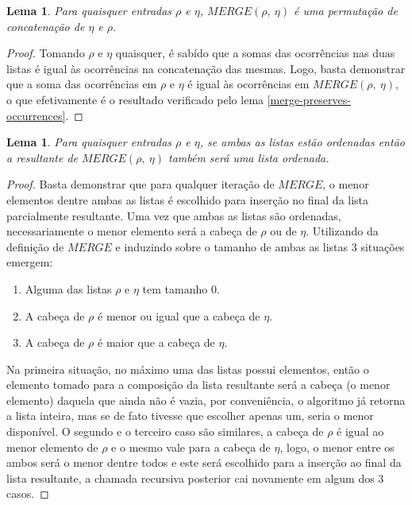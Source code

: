\documentclass[12pt]{article}
\newtheorem{lemma}[theorem]{Lema}
\theoremstyle{definition}
\begin{document}
\begin{lemma}
\label{merge-is-permutation}
        Para quaisquer entradas $\rho$ e $\eta$, $MERGE(\rho,\ \eta)$ é uma permutação de concatenação de $\eta$ e $\rho$.
\end{lemma}
\begin{proof}
        Tomando $\rho$ e $\eta$ quaisquer, é sabído que a somas das ocorrências nas duas listas é igual às ocorrências
        na concatenação das mesmas. Logo, basta demonstrar que a soma das ocorrências em $\rho$ e $\eta$ é igual às
        ocorrências em $MERGE(\rho,\ \eta)$, o que efetivamente é o resultado verificado pelo lema \ref{merge-preserves-occurrences}. 
\end{proof}

\begin{lemma}
\label{merge-of-sorted-is-sorted}
        Para quaisquer entradas $\rho$ e $\eta$, se ambas as listas estão ordenadas então
        a resultante de $MERGE(\rho,\ \eta)$ também será uma lista ordenada. 
\end{lemma}

\begin{proof}
        Basta demonstrar que para qualquer iteração de $MERGE$, o menor elementos dentre ambas as listas é escolhido para inserção no final
        da lista parcialmente resultante. Uma vez que ambas as listas são ordenadas, necessariamente o menor elemento será a cabeça de $\rho$ ou de $\eta$.
        Utilizando da definição de $MERGE$ e induzindo sobre o tamanho de ambas as listas 3 situações emergem:
        \begin{enumerate}
                \item Alguma das listas $\rho$ e $\eta$ tem tamanho 0.
                \item A cabeça de $\rho$ é menor ou igual que a cabeça de $\eta$.
                \item A cabeça de $\rho$ é maior que a cabeça de $\eta$.
        \end{enumerate}

        Na primeira situação, no máximo uma das listas possui elementos, então o elemento tomado para a composição da lista resultante será a cabeça
        (o menor elemento) daquela que ainda não é vazia, por conveniência, o algoritmo já retorna a lista inteira, mas se de fato tivesse que escolher apenas
        um, seria o menor disponível. O segundo e o terceiro caso são similares, a cabeça de $\rho$ é igual ao menor elemento de $\rho$ e o mesmo vale para a cabeça
        de $\eta$, logo, o menor entre os ambos será o menor dentre todos e este será escolhido para a inserção ao final da lista resultante, a chamada recursiva 
        posterior cai novamente em algum dos 3 casos.

\end{proof}
\end{document}
